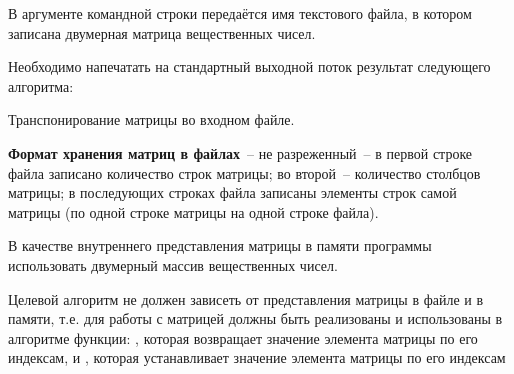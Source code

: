 
В аргументе командной строки передаётся имя текстового файла,
в котором записана двумерная матрица
вещественных чисел.

Необходимо напечатать на стандартный выходной
поток результат следующего алгоритма:

Транспонирование матрицы во входном файле.

\textbf{Формат хранения матриц в файлах}~--
не разреженный~-- в первой строке файла записано количество строк
матрицы; во второй~-- количество столбцов матрицы; в последующих
строках файла записаны элементы строк самой матрицы (по одной
строке матрицы на одной строке файла).

В качестве внутреннего представления матрицы в памяти программы
использовать двумерный массив вещественных чисел.

Целевой алгоритм не
должен зависеть от представления матрицы в файле и в памяти, т.е. для
работы с матрицей должны быть реализованы и использованы в алгоритме
функции: , которая возвращает
значение элемента матрицы по его индексам, и , которая устанавливает значение элемента
матрицы по его индексам
